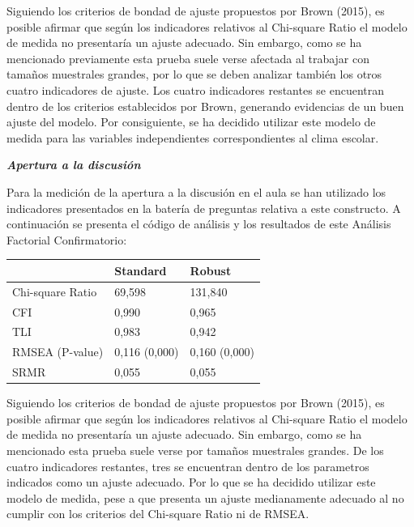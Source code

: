 \documentclass[12pt,twoside]{templates/facsothesis}
\begin{document}
Siguiendo los criterios de bondad de ajuste propuestos por Brown (2015), es posible afirmar que según los indicadores relativos al Chi-square Ratio el modelo de medida no presentaría un ajuste adecuado. Sin embargo, como se ha mencionado previamente esta prueba suele verse afectada al trabajar con tamaños muestrales grandes, por lo que se deben analizar también los otros cuatro indicadores de ajuste. Los cuatro indicadores restantes se encuentran dentro de los criterios establecidos por Brown, generando evidencias de un buen ajuste del modelo. Por consiguiente, se ha decidido utilizar este modelo de medida para las variables independientes correspondientes al clima escolar.

\newpage

\textbf{\emph{Apertura a la discusión}}

Para la medición de la apertura a la discusión en el aula se han utilizado los indicadores presentados en la batería de preguntas relativa a este constructo. A continuación se presenta el código de análisis y los resultados de este Análisis Factorial Confirmatorio:

\begin{longtable}[]{@{}lll@{}}
\toprule
& Standard & Robust \\
\midrule
\endhead
Chi-square Ratio & 69,598 & 131,840 \\
CFI & 0,990 & 0,965 \\
TLI & 0,983 & 0,942 \\
RMSEA (P-value) & 0,116 (0,000) & 0,160 (0,000) \\
SRMR & 0,055 & 0,055 \\
\bottomrule
\end{longtable}

Siguiendo los criterios de bondad de ajuste propuestos por Brown (2015), es posible afirmar que según los indicadores relativos al Chi-square Ratio el modelo de medida no presentaría un ajuste adecuado. Sin embargo, como se ha mencionado esta prueba suele verse por tamaños muestrales grandes. De los cuatro indicadores restantes, tres se encuentran dentro de los parametros indicados como un ajuste adecuado. Por lo que se ha decidido utilizar este modelo de medida, pese a que presenta un ajuste medianamente adecuado al no cumplir con los criterios del Chi-square Ratio ni de RMSEA.



\end{document}
